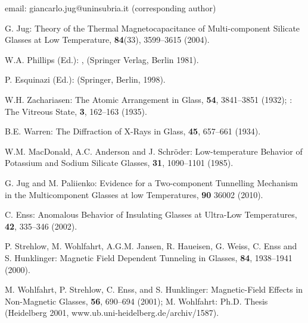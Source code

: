 \documentclass[10pt]{article}
\begin{document}
\newpage
\begin{thebibliography}{99}

 email: giancarlo.jug@uninsubria.it (corresponding author)


 G. Jug:
\newblock Theory of the Thermal Magnetocapacitance of Multi-component
Silicate Glasses at Low Temperature,
 {\bf 84}(33), 3599--3615 (2004).

 W.A. Phillips (Ed.):
,
\newblock  (Springer Verlag, Berlin 1981).

 P. Esquinazi (Ed.):
\newblock (Springer, Berlin, 1998).

 W.H. Zachariasen:
\newblock The Atomic Arrangement in Glass,
 {\bf 54}, 3841--3851 (1932); 
: 
\newblock The Vitreous State,
 {\bf 3}, 162--163 (1935).

 B.E. Warren:
\newblock The Diffraction of X-Rays in Glass,
 {\bf 45}, 657--661 (1934).

 W.M. MacDonald, A.C. Anderson and J. Schr\"oder:
\newblock Low-temperature Behavior of Potassium and Sodium Silicate Glasses,
 {\bf 31}, 1090--1101 (1985).

G. Jug and M. Paliienko:
\newblock Evidence for a Two-component Tunnelling Mechanism in the
Multicomponent Glasses at low Temperatures,
 {\bf 90} 36002 (2010).

 C. Enss:
\newblock Anomalous Behavior of Insulating Glasses at Ultra-Low Temperatures,
 {\bf 42}, 335--346 (2002).

 P. Strehlow, M. Wohlfahrt, A.G.M. Jansen, R. Haueisen, 
G. Weiss, C. Enss and S. Hunklinger: 
\newblock Magnetic Field Dependent Tunneling in Glasses,
 {\bf 84}, 1938--1941 (2000).

M. Wohlfahrt, P. Strehlow, C. Enss, and S. Hunklinger:
\newblock Magnetic-Field Effects in Non-Magnetic Glasses,
 {\bf 56}, 690--694 (2001);
\newblock M. Wohlfahrt: Ph.D. Thesis (Heidelberg 2001,
www.ub.uni-heidelberg.de/archiv/1587).


\end{thebibliography}
\end{document}
